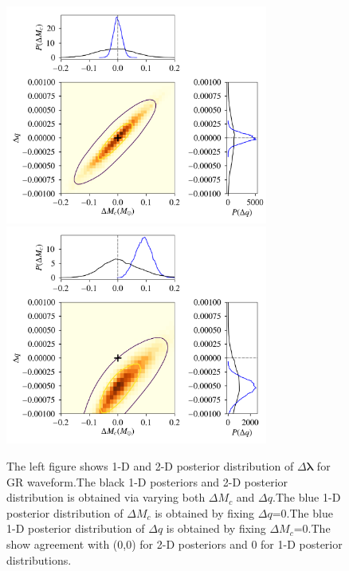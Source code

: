 \documentclass[prl,preprintnumbers,twocolumn,eqsecnum,floatfix,a4paper,nofootinbib,superscriptaddress]{revtex4}
\newcommand{\blambda}{\bm{\lambda}}
\begin{document}
\begin{figure}[htb] \begin{center}
\includegraphics[width=3.4in]{figs/triangle_plot_gr.png}
\includegraphics[width=3.4in]{figs/triangle_plot_mod_gr.png}
\caption{The left figure shows 1-D and 2-D posterior distribution of $\Delta \blambda$ for GR waveform.The black 1-D posteriors and 2-D posterior distribution is obtained via varying both $\Delta M_c$ and $\Delta q$.The blue 1-D posterior distribution of $\Delta M_c$  is obtained by fixing $\Delta q$=0.The blue 1-D posterior distribution of $\Delta q$  is obtained by fixing $\Delta M_c$=0.The show agreement with (0,0) for 2-D posteriors and 0 for 1-D posterior distributions.}
\label{fig:contour_plots}
\end{center} \end{figure}
\end{document}
